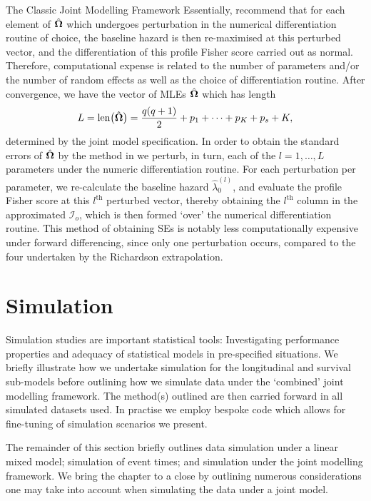\begin{chapter}{\label{cha:methods-classic}The Classic Joint Modelling Framework}
  Essentially, \citet{Xu2014} recommend that for each element of $\hat{\bm{\Omega}}$ which undergoes perturbation in the numerical differentiation routine of choice, the baseline hazard is then re-maximised at this perturbed vector, and the differentiation of this profile Fisher score carried out as normal. Therefore, computational expense is related to the number of parameters and/or the number of random effects as well as the choice of differentiation routine. After convergence, we have the vector of MLEs $\hat{\bm{\Omega}}$ which has length
  \begin{equation}
      L=\mathrm{len}\big(\hat{\bm{\Omega}}\big)=\frac{q\!\left( q+1\right)}{2}+p_1+\dots+p_K+p_s+K,
  \label{eq:methods-length-of-omega}
  \end{equation}
  determined by the joint model specification. In order to obtain the standard errors of $\hat{\bm{\Omega}}$ by the method in \citet{Xu2014} we perturb, in turn, each of the $l=1,\dots,L$ parameters under the numeric differentiation routine. For each perturbation per parameter, we re-calculate the baseline hazard $\hat{\lambda}^{(l)}_0$, and evaluate the profile Fisher score at this $l^{\mathrm{th}}$ perturbed vector, thereby obtaining the $l^{\mathrm{th}}$ column in the approximated $\mathcal{I}_o$, which is then formed `over' the numerical differentiation routine. This method of obtaining SEs is notably less computationally expensive under forward differencing, since only one perturbation occurs, compared to the four undertaken by the Richardson extrapolation.
  
  \section{\label{sec:methods-simulation}Simulation}
  Simulation studies are important statistical tools: Investigating performance properties and adequacy of statistical models in pre-specified situations. We briefly illustrate how we undertake simulation for the longitudinal and survival sub-models before outlining how we simulate data under the `combined' joint modelling framework. The method(s) outlined are then carried forward in all simulated datasets used. In practise we employ bespoke code which allows for fine-tuning of simulation scenarios we present. 
  
  The remainder of this section briefly outlines data simulation under a linear mixed model; simulation of event times; and simulation under the joint modelling framework. We bring the chapter to a close by outlining numerous considerations one may take into account when simulating the data under a joint model.
  

\end{chapter}
